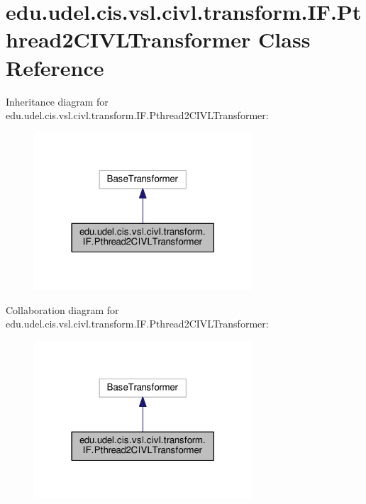 \hypertarget{classedu_1_1udel_1_1cis_1_1vsl_1_1civl_1_1transform_1_1IF_1_1Pthread2CIVLTransformer}{}\section{edu.\+udel.\+cis.\+vsl.\+civl.\+transform.\+I\+F.\+Pthread2\+C\+I\+V\+L\+Transformer Class Reference}
\label{classedu_1_1udel_1_1cis_1_1vsl_1_1civl_1_1transform_1_1IF_1_1Pthread2CIVLTransformer}


Inheritance diagram for edu.\+udel.\+cis.\+vsl.\+civl.\+transform.\+I\+F.\+Pthread2\+C\+I\+V\+L\+Transformer\+:
\nopagebreak
\begin{figure}[H]
\begin{center}
\leavevmode
\includegraphics[width=230pt]{classedu_1_1udel_1_1cis_1_1vsl_1_1civl_1_1transform_1_1IF_1_1Pthread2CIVLTransformer__inherit__graph}
\end{center}
\end{figure}


Collaboration diagram for edu.\+udel.\+cis.\+vsl.\+civl.\+transform.\+I\+F.\+Pthread2\+C\+I\+V\+L\+Transformer\+:
\nopagebreak
\begin{figure}[H]
\begin{center}
\leavevmode
\includegraphics[width=230pt]{classedu_1_1udel_1_1cis_1_1vsl_1_1civl_1_1transform_1_1IF_1_1Pthread2CIVLTransformer__coll__graph}
\end{center}
\end{figure}
